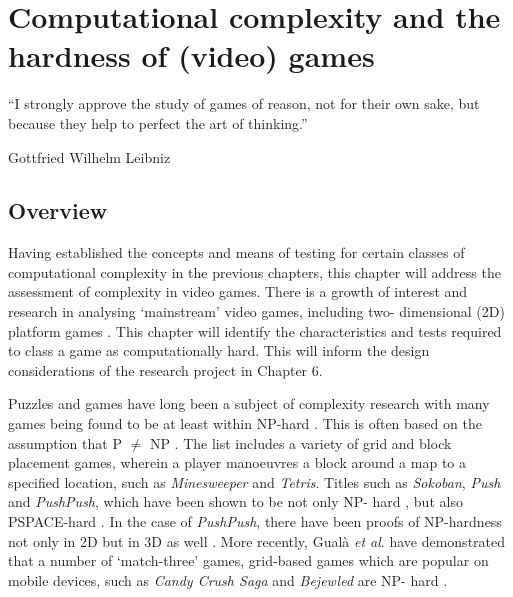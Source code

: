 \documentclass[11pt, a4paper, oneside]{report} %
\begin{document}

\chapter{Computational complexity and the hardness of (video) games}

\epigraph{``I strongly approve the study of games of reason, not for their own
sake, but because they help to perfect the art of thinking.''}{Gottfried
Wilhelm Leibniz}

\section{Overview}

Having established the concepts and means of testing for certain classes of
computational complexity in the previous chapters, this chapter will address the
assessment of complexity in video games. There is a growth of interest and
research in analysing `mainstream' video games, including two- dimensional (2D)
platform games  \cite{viglietta2014gaming, DBLP:conf/fun/Forisek10, Aloupis2012,
Smith:2008:FAP:1401843.1401858}. This chapter will identify the characteristics
and tests required to class a game as computationally hard. This will inform the
design considerations of the research project in Chapter 6.

Puzzles and games have long been a subject of complexity research with many
games being found to be at least within NP-hard \cite{kendall2008survey}. This
is often based on the assumption that P $\neq$ NP \cite{demaine2001playing}. The
list includes a variety of grid and block placement games, wherein a player
manoeuvres a block around a map to a specified location, such as
\textit{Minesweeper}\cite{kaye2000minesweeper} and
\textit{Tetris}\cite{demaine2003tetris}. Titles such as \textit{Sokoban},
\textit{Push} and \textit{PushPush}, which have been shown to be not only NP-
hard \cite{demaine2000pushpush}, but also PSPACE-hard
\cite{culberson1999sokoban, dor1999sokoban}. In the case of \textit{PushPush},
there have been proofs of NP-hardness not only in 2D but in 3D as well
\cite{o1999pushpush}. More recently, Gual\`{a} \textit{et al}. have demonstrated
that a number of `match-three' games, grid-based games which are popular on
mobile devices, such as \textit{Candy Crush Saga} and \textit{Bejewled} are NP-
hard \cite{DBLP:journals/corr/GualaLN14}.
\end{document}
